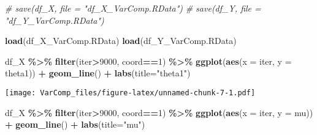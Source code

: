 \documentclass[
]{article}
\newenvironment{Shaded}{\begin{snugshade}}{\end{snugshade}}
\newcommand{\AttributeTok}[1]{\textcolor[rgb]{0.13,0.29,0.53}{#1}}
\newcommand{\CommentTok}[1]{\textcolor[rgb]{0.56,0.35,0.01}{\textit{#1}}}
\newcommand{\DecValTok}[1]{\textcolor[rgb]{0.00,0.00,0.81}{#1}}
\newcommand{\FunctionTok}[1]{\textcolor[rgb]{0.13,0.29,0.53}{\textbf{#1}}}
\newcommand{\NormalTok}[1]{#1}
\newcommand{\SpecialCharTok}[1]{\textcolor[rgb]{0.81,0.36,0.00}{\textbf{#1}}}
\newcommand{\StringTok}[1]{\textcolor[rgb]{0.31,0.60,0.02}{#1}}
\begin{document}
\begin{Shaded}
\begin{Highlighting}[]
\CommentTok{\# save(df\_X, file = "df\_X\_VarComp.RData")}
\CommentTok{\# save(df\_Y, file = "df\_Y\_VarComp.RData")}
\end{Highlighting}
\end{Shaded}

\begin{Shaded}
\begin{Highlighting}[]
\FunctionTok{load}\NormalTok{(}\StringTok{\textquotesingle{}df\_X\_VarComp.RData\textquotesingle{}}\NormalTok{)}
\FunctionTok{load}\NormalTok{(}\StringTok{\textquotesingle{}df\_Y\_VarComp.RData\textquotesingle{}}\NormalTok{)}
\end{Highlighting}
\end{Shaded}

\begin{Shaded}
\begin{Highlighting}[]
\NormalTok{df\_X }\SpecialCharTok{\%\textgreater{}\%}
  \FunctionTok{filter}\NormalTok{(iter}\SpecialCharTok{\textgreater{}}\DecValTok{9000}\NormalTok{, coord}\SpecialCharTok{==}\DecValTok{1}\NormalTok{) }\SpecialCharTok{\%\textgreater{}\%} 
  \FunctionTok{ggplot}\NormalTok{(}\FunctionTok{aes}\NormalTok{(}\AttributeTok{x =}\NormalTok{ iter, }\AttributeTok{y =}\NormalTok{ theta1)) }\SpecialCharTok{+}
  \FunctionTok{geom\_line}\NormalTok{() }\SpecialCharTok{+} \FunctionTok{labs}\NormalTok{(}\AttributeTok{title=}\StringTok{"theta1"}\NormalTok{)}
\end{Highlighting}
\end{Shaded}

\texttt{[image: VarComp\_files/figure-latex/unnamed-chunk-7-1.pdf]}

\begin{Shaded}
\begin{Highlighting}[]
\NormalTok{df\_X }\SpecialCharTok{\%\textgreater{}\%}
  \FunctionTok{filter}\NormalTok{(iter}\SpecialCharTok{\textgreater{}}\DecValTok{9000}\NormalTok{, coord}\SpecialCharTok{==}\DecValTok{1}\NormalTok{) }\SpecialCharTok{\%\textgreater{}\%} 
  \FunctionTok{ggplot}\NormalTok{(}\FunctionTok{aes}\NormalTok{(}\AttributeTok{x =}\NormalTok{ iter, }\AttributeTok{y =}\NormalTok{ mu)) }\SpecialCharTok{+}
  \FunctionTok{geom\_line}\NormalTok{() }\SpecialCharTok{+} \FunctionTok{labs}\NormalTok{(}\AttributeTok{title=}\StringTok{"mu"}\NormalTok{)}
\end{Highlighting}
\end{Shaded}
\end{document}
